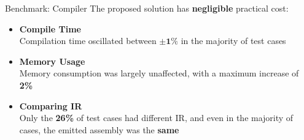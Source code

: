 \begin{frame}{Benchmark: Compiler}
    The proposed solution has \textbf{negligible} practical cost:
   \begin{itemize}
       \item \textbf{Compile Time}\\
         Compilation time oscillated between $\boldsymbol{\pm 1\%}$ in the majority of test cases
        \item \textbf{Memory Usage}\\
          Memory consumption was largely unaffected, with a maximum increase of \textbf{2\%}
        \item \textbf{Comparing IR}\\
          Only the \textbf{26\%} of test cases had different IR, and even in the majority of cases, the emitted assembly was the \textbf{same}
   \end{itemize} 
\end{frame}
